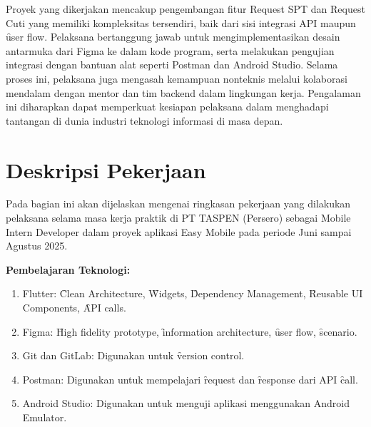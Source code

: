 Proyek yang dikerjakan mencakup pengembangan fitur Request SPT dan Request Cuti yang memiliki kompleksitas tersendiri, baik dari sisi integrasi API maupun \f{user flow}. Pelaksana bertanggung jawab untuk mengimplementasikan desain antarmuka dari Figma ke dalam kode program, serta melakukan pengujian integrasi dengan bantuan alat seperti Postman dan Android Studio. Selama proses ini, pelaksana juga mengasah kemampuan nonteknis melalui kolaborasi mendalam dengan mentor dan tim backend dalam lingkungan kerja. Pengalaman ini diharapkan dapat memperkuat kesiapan pelaksana dalam menghadapi tantangan di dunia industri teknologi informasi di masa depan.



\section{Deskripsi Pekerjaan}
\label{sec:deskripsiPekerjaan}
Pada bagian ini akan dijelaskan mengenai ringkasan pekerjaan yang dilakukan
pelaksana selama masa kerja praktik di PT TASPEN (Persero) sebagai Mobile
Intern Developer dalam proyek aplikasi Easy Mobile pada periode Juni sampai
Agustus 2025.

\vspace{0.3cm}
\noindent\textbf{Pembelajaran Teknologi:}
\begin{enumerate}
    \item Flutter: \f{Clean Architecture}, \f{Widgets}, \f{Dependency Management},
    \f{Reusable UI Components}, \f{API calls}.
    \item Figma: \f{High fidelity prototype}, \f{information architecture},
    \f{user flow}, \f{scenario}.
    \item Git dan GitLab: Digunakan untuk \f{version control}.
    \item Postman: Digunakan untuk mempelajari \f{request} dan \f{response}
    dari API \f{call}.
    \item Android Studio: Digunakan untuk menguji aplikasi menggunakan Android
    Emulator.
\end{enumerate}

